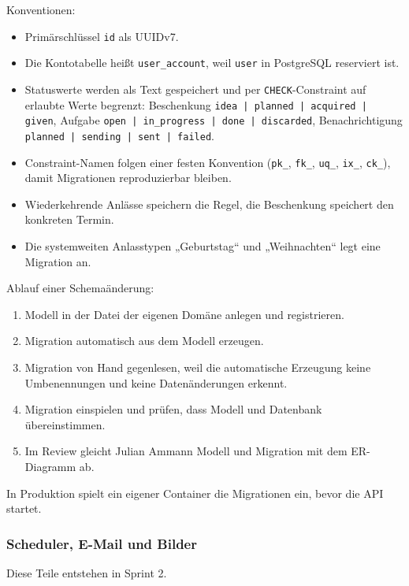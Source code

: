 \documentclass[11pt,a4paper]{article}
\begin{document}
Konventionen:

\begin{itemize}
\item Primärschlüssel \texttt{id} als UUIDv7.
\item Die Kontotabelle heißt \texttt{user\_\allowbreak{}account}, weil \texttt{user} in PostgreSQL reserviert ist.
\item Statuswerte werden als Text gespeichert und per \texttt{CHECK}-Constraint auf erlaubte Werte begrenzt: Beschenkung \texttt{idea | planned | acquired | given}, Aufgabe \texttt{open | in\_\allowbreak{}progress | done | discarded}, Benachrichtigung \texttt{planned | sending | sent | failed}.
\item Constraint-Namen folgen einer festen Konvention (\texttt{pk\_\allowbreak{}}, \texttt{fk\_\allowbreak{}}, \texttt{uq\_\allowbreak{}}, \texttt{ix\_\allowbreak{}}, \texttt{ck\_\allowbreak{}}), damit Migrationen reproduzierbar bleiben.
\item Wiederkehrende Anlässe speichern die Regel, die Beschenkung speichert den konkreten Termin.
\item Die systemweiten Anlasstypen „Geburtstag“ und „Weihnachten“ legt eine Migration an.
\end{itemize}


Ablauf einer Schemaänderung:

\begin{enumerate}
\item Modell in der Datei der eigenen Domäne anlegen und registrieren.
\item Migration automatisch aus dem Modell erzeugen.
\item Migration von Hand gegenlesen, weil die automatische Erzeugung keine Umbenennungen und keine Datenänderungen erkennt.
\item Migration einspielen und prüfen, dass Modell und Datenbank übereinstimmen.
\item Im Review gleicht Julian Ammann Modell und Migration mit dem ER-Diagramm ab.
\end{enumerate}


In Produktion spielt ein eigener Container die Migrationen ein, bevor die API startet.

\subsubsection{Scheduler, E-Mail und Bilder}

Diese Teile entstehen in Sprint 2.
\end{document}
